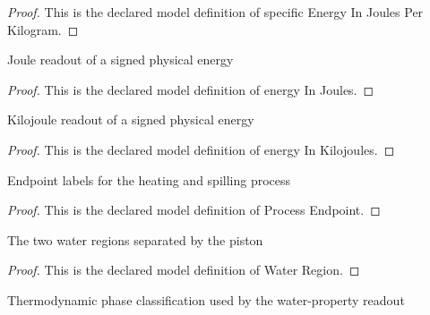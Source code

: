 \begin{proof}
  This is the declared model definition of specific Energy In Joules Per Kilogram.
\end{proof}
\begin{definition}
  \label{def:physics:phyx-mini-0453:phyxminiproblems-problemphyxmini0453-energyinjoules}
  Joule readout of a signed physical energy
\end{definition}
\begin{proof}
  This is the declared model definition of energy In Joules.
\end{proof}
\begin{definition}
  \label{def:physics:phyx-mini-0453:phyxminiproblems-problemphyxmini0453-energyinkilojoules}
  Kilojoule readout of a signed physical energy
\end{definition}
\begin{proof}
  This is the declared model definition of energy In Kilojoules.
\end{proof}
\begin{definition}
  \label{def:physics:phyx-mini-0453:phyxminiproblems-problemphyxmini0453-processendpoint}
  Endpoint labels for the heating and spilling process
\end{definition}
\begin{proof}
  This is the declared model definition of Process Endpoint.
\end{proof}
\begin{definition}
  \label{def:physics:phyx-mini-0453:phyxminiproblems-problemphyxmini0453-waterregion}
  The two water regions separated by the piston
\end{definition}
\begin{proof}
  This is the declared model definition of Water Region.
\end{proof}
\begin{definition}
  \label{def:physics:phyx-mini-0453:phyxminiproblems-problemphyxmini0453-waterphase}
  Thermodynamic phase classification used by the water-property readout
\end{definition}
